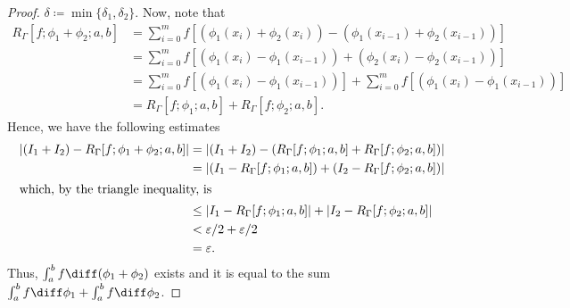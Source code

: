 \begin{proof}
$\delta\coloneqq\min\{\delta_1,\delta_2\}$. Now, note that
\begin{align}
  \label{eq:7}
R_{\Gamma}[f;\phi_1+\phi_2;a,b]
&=\sum_{i=0}^mf\left[(\phi_1(x_i)+\phi_2(x_i))
                   -(\phi_1(x_{i-1})+\phi_2(x_{i-1}))\right]\nonumber\\
&=\sum_{i=0}^mf\left[(\phi_1(x_i)-\phi_1(x_{i-1}))
                   +(\phi_2(x_i)-\phi_2(x_{i-1}))\right]\nonumber\\
&=\sum_{i=0}^mf\left[(\phi_1(x_i)-\phi_1(x_{i-1}))\right]
+\sum_{i=0}^mf\left[(\phi_1(x_i)-\phi_1(x_{i-1}))\right]\nonumber\\
&=R_\Gamma[f;\phi_1;a,b]+R_\Gamma[f;\phi_2;a,b].
\end{align}
Hence, we have the following estimates
\begin{align*}
\left|(I_1+I_2)-R_{\Gamma}[f;\phi_1+\phi_2;a,b]\right|
&=\left|(I_1+I_2)-(R_\Gamma[f;\phi_1;a,b]+R_\Gamma[f;\phi_2;a,b])\right|\\
&=\left|(I_1-R_\Gamma[f;\phi_1;a,b])+(I_2-R_\Gamma[f;\phi_2;a,b])\right|\\
\intertext{which, by the triangle inequality, is}
&\leq\left|I_1-R_\Gamma[f;\phi_1;a,b]\right|+
  \left|I_2-R_\Gamma[f;\phi_2;a,b]\right|\\
&<\varepsilon/2+\varepsilon/2\\
&=\varepsilon.
\end{align*}
Thus, $\int_a^bf\diff(\phi_1+\phi_2)$ exists and it is equal to the sum
$\int_a^bf\diff\phi_1+\int_a^bf\diff\phi_2$.
\end{proof}
\newpage

